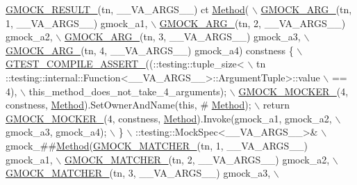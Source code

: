 \begin{DoxyCode}
\hyperlink{gmock-generated-function-mockers_8h_a0e9d94e9c77df84f1103af06feee1077}{GMOCK\_RESULT\_}(tn, \_\_VA\_ARGS\_\_) ct \hyperlink{gmock-spec-builders__test_8cc_a95606368148f3e5aab5db46c32466afd}{Method}( \(\backslash\)
      \hyperlink{gmock-generated-function-mockers_8h_a887575cc1c31158fba808180a10c004f}{GMOCK\_ARG\_}(tn, 1, \_\_VA\_ARGS\_\_) gmock\_a1, \(\backslash\)
      \hyperlink{gmock-generated-function-mockers_8h_a887575cc1c31158fba808180a10c004f}{GMOCK\_ARG\_}(tn, 2, \_\_VA\_ARGS\_\_) gmock\_a2, \(\backslash\)
      \hyperlink{gmock-generated-function-mockers_8h_a887575cc1c31158fba808180a10c004f}{GMOCK\_ARG\_}(tn, 3, \_\_VA\_ARGS\_\_) gmock\_a3, \(\backslash\)
      \hyperlink{gmock-generated-function-mockers_8h_a887575cc1c31158fba808180a10c004f}{GMOCK\_ARG\_}(tn, 4, \_\_VA\_ARGS\_\_) gmock\_a4) constness \{ \hyperlink{gtest-port_8h_ae1f37dc71d5daa6fb49ca1b6047d4a8c}{\(\backslash\)}
\hyperlink{gtest-port_8h_ae1f37dc71d5daa6fb49ca1b6047d4a8c}{    GTEST\_COMPILE\_ASSERT\_}((::testing::tuple\_size<                          \(\backslash\)
        tn ::testing::internal::Function<\_\_VA\_ARGS\_\_>::ArgumentTuple>::value \(\backslash\)
            == 4), \(\backslash\)
        this\_method\_does\_not\_take\_4\_arguments); \hyperlink{gmock-generated-function-mockers_8h_a7d362499e27b1bc3a9806dd3cf58a5b7}{\(\backslash\)}
\hyperlink{gmock-generated-function-mockers_8h_a7d362499e27b1bc3a9806dd3cf58a5b7}{    GMOCK\_MOCKER\_}(4, constness, \hyperlink{gmock-spec-builders__test_8cc_a95606368148f3e5aab5db46c32466afd}{Method}).SetOwnerAndName(\textcolor{keyword}{this}, #
      \hyperlink{gmock-spec-builders__test_8cc_a95606368148f3e5aab5db46c32466afd}{Method}); \(\backslash\)
    return \hyperlink{gmock-generated-function-mockers_8h_a7d362499e27b1bc3a9806dd3cf58a5b7}{GMOCK\_MOCKER\_}(4, constness, \hyperlink{gmock-spec-builders__test_8cc_a95606368148f3e5aab5db46c32466afd}{Method}).Invoke(gmock\_a1, gmock\_a2, \(\backslash\)
        gmock\_a3, gmock\_a4); \(\backslash\)
  \} \(\backslash\)
  ::testing::MockSpec<\_\_VA\_ARGS\_\_>& \(\backslash\)
      gmock\_##\hyperlink{gmock-spec-builders__test_8cc_a95606368148f3e5aab5db46c32466afd}{Method}(\hyperlink{gmock-generated-function-mockers_8h_aa87d0009fe91f1c89d658776b55a769c}{GMOCK\_MATCHER\_}(tn, 1, \_\_VA\_ARGS\_\_) gmock\_a1, \(\backslash\)
                     \hyperlink{gmock-generated-function-mockers_8h_aa87d0009fe91f1c89d658776b55a769c}{GMOCK\_MATCHER\_}(tn, 2, \_\_VA\_ARGS\_\_) gmock\_a2, \(\backslash\)
                     \hyperlink{gmock-generated-function-mockers_8h_aa87d0009fe91f1c89d658776b55a769c}{GMOCK\_MATCHER\_}(tn, 3, \_\_VA\_ARGS\_\_) gmock\_a3, \(\backslash\)

\end{DoxyCode}
